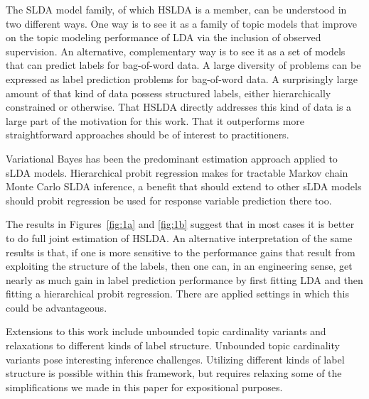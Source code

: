 
The SLDA model family, of which HSLDA is a member, can be understood in two
different ways. One way is to see it as a family of topic models that improve
on the topic modeling performance of LDA via the inclusion of observed
supervision. An alternative, complementary way is to see it as a set of models
that can predict labels for bag-of-word data. A large diversity of problems
can be expressed as label prediction problems for bag-of-word data. A
surprisingly large amount of that kind of data possess structured labels,
either hierarchically constrained or otherwise. That HSLDA directly addresses
this kind of data is a large part of the motivation for this work. That it
outperforms more straightforward approaches should be of interest to
practitioners.

Variational Bayes has been the predominant estimation approach applied to sLDA
models. Hierarchical probit regression makes for tractable Markov chain Monte
Carlo SLDA inference, a benefit that should extend to other sLDA models should
probit regression be used for response variable prediction there too.

The results in Figures~\ref{fig:1a} and \ref{fig:1b} suggest that in most cases
it is better to do full joint estimation of HSLDA.  An alternative
interpretation of the same results is that, if one is more sensitive to the
performance gains that result from exploiting the structure of the labels, then
one can, in an engineering sense, get nearly as much gain in label prediction
performance by first fitting LDA and then fitting a hierarchical probit
regression.  There are applied settings in which this could be advantageous.

Extensions to this work include unbounded topic cardinality variants and
relaxations to different kinds of label structure.  Unbounded topic cardinality
variants pose interesting inference challenges.  Utilizing different kinds of
label structure is possible within this framework, but requires relaxing some
of the simplifications we made in this paper for expositional purposes.

